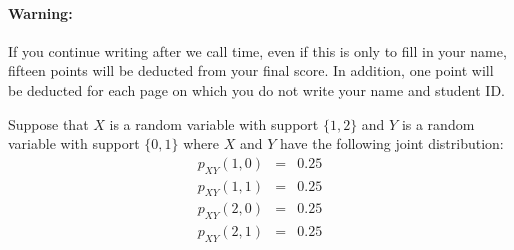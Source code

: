 \documentclass[addpoints,12pt]{exam}
\begin{document}
\paragraph{Warning:} If you continue writing after we call time, even if this is only to fill in your name, fifteen points will be deducted from your final score. In addition, one point will be deducted for each page on which you do not write your name and student ID. 

\newpage
\begin{questions}
\question Suppose that $X$ is a random variable with support $\{1,2\}$ and $Y$ is a random variable with support $\{0,1\}$ where $X$ and $Y$ have the following joint distribution:
			\begin{eqnarray*}
				p_{XY}(1,0) &=& 0.25\\
				p_{XY}(1,1) &=&0.25\\
				p_{XY}(2,0) &=&0.25\\
				p_{XY}(2,1) &=&0.25
			\end{eqnarray*}
\end{questions}
\end{document}

